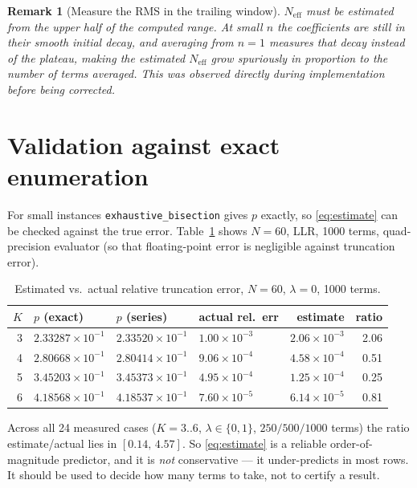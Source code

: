 \documentclass[11pt]{article}
\newtheorem{remark}{Remark}
\newcommand{\Neff}{N_{\mathrm{eff}}}
\begin{document}
\begin{remark}[Measure the RMS in the trailing window]
$\Neff$ must be estimated from the upper half of the computed range. At small $n$ the coefficients
are still in their smooth initial decay, and averaging from $n=1$ measures that decay instead of
the plateau, making the estimated $\Neff$ grow spuriously in proportion to the number of terms
averaged. This was observed directly during implementation before being corrected.
\end{remark}

\section{Validation against exact enumeration}
\label{sec:validation}

For small instances \texttt{exhaustive\_bisection} gives $p$ exactly, so \eqref{eq:estimate} can be
checked against the true error. Table~\ref{tab:oracle} shows $N=60$, LLR, 1000 terms, quad-precision
evaluator (so that floating-point error is negligible against truncation error).

\begin{table}[h]
\centering
\caption{Estimated vs.\ actual relative truncation error, $N=60$, $\lambda=0$, 1000 terms.}
\label{tab:oracle}
\begin{tabular}{@{}rlllrr@{}}
\toprule
$K$ & $p$ (exact) & $p$ (series) & actual rel.\ err & estimate & ratio \\
\midrule
3 & $2.33287\times10^{-1}$ & $2.33520\times10^{-1}$ & $1.00\times10^{-3}$ & $2.06\times10^{-3}$ & 2.06 \\
4 & $2.80668\times10^{-1}$ & $2.80414\times10^{-1}$ & $9.06\times10^{-4}$ & $4.58\times10^{-4}$ & 0.51 \\
5 & $3.45203\times10^{-1}$ & $3.45373\times10^{-1}$ & $4.95\times10^{-4}$ & $1.25\times10^{-4}$ & 0.25 \\
6 & $4.18568\times10^{-1}$ & $4.18537\times10^{-1}$ & $7.60\times10^{-5}$ & $6.14\times10^{-5}$ & 0.81 \\
\bottomrule
\end{tabular}
\end{table}

Across all 24 measured cases ($K=3..6$, $\lambda\in\{0,1\}$, $250/500/1000$ terms) the ratio
estimate/actual lies in $[0.14,\,4.57]$. So \eqref{eq:estimate} is a reliable order-of-magnitude
predictor, and it is \emph{not} conservative — it under-predicts in most rows. It should be used to
decide how many terms to take, not to certify a result.
\end{document}
